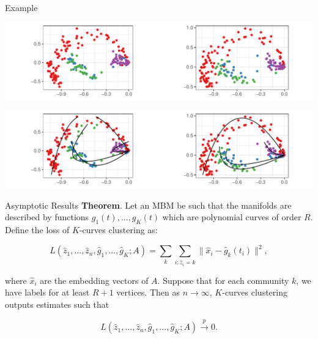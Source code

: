 \documentclass[
  ignorenonframetext,
]{beamer}
\begin{document}
\begin{frame}{Example}
\protect\hypertarget{example}{}
\begin{center}\includegraphics[width=1\linewidth]{slides_files/figure-beamer/mbconnectome-ase-2-1} \end{center}

\begin{center}\includegraphics[width=1\linewidth]{slides_files/figure-beamer/mbconnectome-kcurves-1} \end{center}
\end{frame}

\begin{frame}{Asymptotic Results}
\protect\hypertarget{asymptotic-results}{}
\textbf{Theorem}. Let an MBM be such that the manifolds are described by
functions \(g_1(t), ..., g_K(t)\) which are polynomial curves of order
\(R\). Define the loss of \(K\)-curves clustering as:

\[L(\hat{z}_1, ..., \hat{z}_n, \hat{g}_1, ..., \hat{g}_K; A) = \sum_k \sum_{i : \hat{z}_i = k} \|\hat{x}_{i} - \hat{g}_k(t_{i})\|^2,\]

where \(\hat{x}_i\) are the embedding vectors of \(A\). Suppose that for
each community \(k\), we have labels for at least \(R + 1\) vertices.
Then as \(n \to \infty\), \(K\)-curves clustering outputs estimates such
that

\[L(\hat{z}_1, ..., \hat{z}_n, \hat{g}_1, ..., \hat{g}_K; A) \stackrel{p}{\to} 0.\]
\end{frame}
\end{document}
